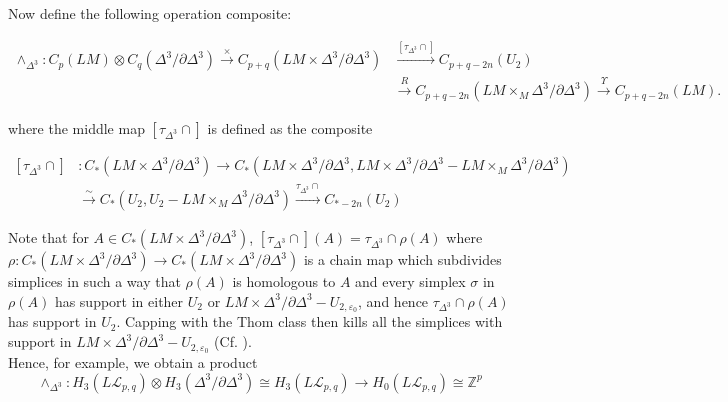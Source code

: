\documentclass[reqno]{amsart}
\theoremstyle{definition}
\theoremstyle{remark}
\begin{document}
Now define the following operation composite:

\begin{align*}
    \wedge_{\Delta^3} \colon C_p(LM) \otimes 
    C_q(\Delta^{3} / \partial \Delta^3) \stackrel{\times }{\longrightarrow} 
    C_{p+q}\left( LM \times \Delta^3 / \partial \Delta^3 \right) 
    &\stackrel{\left[ \tau_{\Delta^3} \cap \right] }{\longrightarrow} 
    C_{p+q-2n} (U_2) \\
    &\stackrel{R}{\longrightarrow} C_{p+q-2n}
    \left( LM \times_M \Delta^3 / \partial \Delta^3 \right) 
    \stackrel{\Upsilon}{\longrightarrow} C_{p+q-2n}(LM).
\end{align*}

where the middle map
$\left[ \tau_{\Delta^3} \cap  \right] $ is defined as the composite

\begin{align*}
    \left[ \tau_{\Delta^3}\cap \right] 
    &\colon
C_{*}\left( LM \times \Delta^3 / \partial \Delta^3 \right) 
\to C_{*}\left( LM \times \Delta^3 / \partial \Delta^3 , LM \times \Delta^3 
    / \partial \Delta^3 - 
LM \times_M \Delta^3 / \partial \Delta^3 \right) \\
    &\stackrel{\sim}{\longrightarrow} 
C_* \left( U_2, U_2 - LM \times_M \Delta^3 / \partial \Delta^3 \right) 
         \stackrel{\tau_{\Delta^3} \cap}{\longrightarrow} 
        C_{* - 2n}\left( U_2 \right) 
\end{align*}

Note that for $A \in C_* \left( LM \times \Delta^3 / \partial \Delta^3
\right) $, $\left[ \tau_{\Delta^3} \cap \right] (A) = 
\tau_{\Delta^3} \cap \rho (A)$ where
$\rho \colon C_* \left( LM \times \Delta^3 / \partial \Delta^3 \right) 
\to C_* \left( LM \times \Delta^3 / \partial \Delta^3 \right) $ is a
chain map which subdivides simplices in such a way
that $\rho (A)$ is homologous to $A$ and every
simplex $\sigma$ in $\rho (A)$ has support
in either $U_2$ or $LM \times \Delta^3 / \partial \Delta^3 -
U_{2, \varepsilon_0}$, and hence
$\tau_{\Delta^3} \cap \rho (A)$ has support
in $U_{2}$.
Capping with the Thom class then kills all the simplices with support
in $LM \times \Delta^3 / \partial \Delta^3 - 
U_{2, \varepsilon_0}$ (Cf. \cite{Hingston-Wahl}).\\

Hence, for example, we obtain a product
\[
\wedge_{\Delta^3} \colon
H_{3}\left( L \mathcal{L}_{p,q} \right) 
\otimes H_3\left( \Delta^3 / \partial \Delta^3 \right) 
\cong H_3 \left( L \mathcal{L}_{p,q} \right) \to 
H_{0}\left( L \mathcal{L}_{p,q} \right) 
\cong \mathbb{Z}^{p}
\] 
\end{document}
